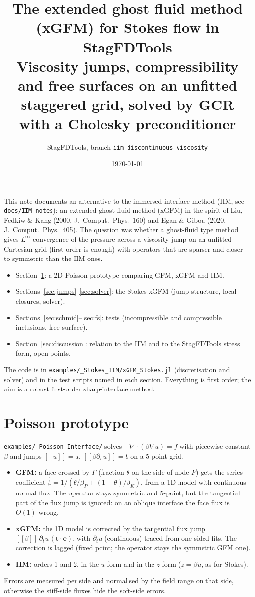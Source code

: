 \documentclass[11pt,a4paper]{article}
\title{The extended ghost fluid method (xGFM) for Stokes flow in StagFDTools\\[2pt]
\large Viscosity jumps, compressibility and free surfaces on an unfitted staggered grid,
solved by GCR with a Cholesky preconditioner}
\author{StagFDTools, branch \texttt{iim-discontinuous-viscosity}}
\date{\today}
\newcommand{\code}[1]{\texttt{#1}}
\newcommand{\jump}[1]{[\![#1]\!]}
\begin{document}
\maketitle

\noindent This note documents an alternative to the immersed interface method (IIM, see
\code{docs/IIM\_notes}): an extended ghost fluid method (xGFM) in the spirit of
Liu, Fedkiw \& Kang (2000, J.~Comput.\ Phys.\ 160) and Egan \& Gibou (2020, J.~Comput.\ Phys.\
405). The question was whether a ghost-fluid type method gives $L^\infty$ convergence of the
pressure across a viscosity jump on an unfitted Cartesian grid (first order is enough) with
operators that are sparser and closer to symmetric than the IIM ones.
\begin{itemize}
  \item Section~\ref{sec:poisson}: a 2D Poisson prototype comparing GFM, xGFM and IIM.
  \item Sections~\ref{sec:jumps}--\ref{sec:solver}: the Stokes xGFM (jump structure, local
    closures, solver).
  \item Sections~\ref{sec:schmid}--\ref{sec:fs}: tests (incompressible and compressible
    inclusions, free surface).
  \item Section~\ref{sec:discussion}: relation to the IIM and to the StagFDTools stress form,
    open points.
\end{itemize}
The code is in \code{examples/\_Stokes\_IIM/xGFM\_Stokes.jl} (discretisation and solver) and
in the test scripts named in each section. Everything is first order; the aim is a robust
first-order sharp-interface method.

\section{Poisson prototype}\label{sec:poisson}

\code{examples/\_Poisson\_Interface/} solves $-\nabla\cdot(\beta\nabla u)=f$ with piecewise
constant $\beta$ and jumps $\jump{u}=a$, $\jump{\beta\partial_n u}=b$ on a 5-point grid.
\begin{itemize}
  \item \textbf{GFM:} a face crossed by $\Gamma$ (fraction $\theta$ on the side of node $P$)
    gets the series coefficient $\hat\beta=1/(\theta/\beta_P+(1-\theta)/\beta_K)$, from a 1D
    model with continuous normal flux. The operator stays symmetric and 5-point, but the
    tangential part of the flux jump is ignored: on an oblique interface the face flux is
    $O(1)$ wrong.
  \item \textbf{xGFM:} the 1D model is corrected by the tangential flux jump
    $\jump{\beta}\,\partial_t u\,(\mathbf t\cdot\mathbf e)$, with $\partial_t u$ (continuous)
    traced from one-sided fits. The correction is lagged (fixed point; the operator stays
    the symmetric GFM one).
  \item \textbf{IIM:} orders 1 and 2, in the $u$-form and in the $z$-form ($z=\beta u$, as for
    Stokes).
\end{itemize}
Errors are measured per side and normalised by the field range on that side, otherwise the
stiff-side fluxes hide the soft-side errors.
\end{document}
